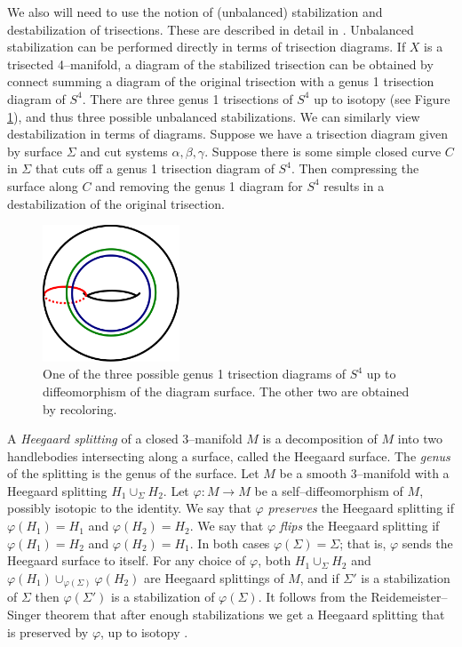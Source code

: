 \documentclass[12pt]{amsart}
\theoremstyle{definition}
\theoremstyle{remark}
\begin{document}
We also will need to use the notion of (unbalanced) stabilization and destabilization of trisections.
These are described in detail in \cite{MeierSchirmerZupan1}.
Unbalanced stabilization can be performed directly in terms of trisection diagrams.
If $X$ is a trisected 4--manifold, a diagram of the stabilized trisection can be obtained by connect summing a diagram of the original trisection with a genus 1 trisection diagram of $S^4$.
There are three genus 1 trisections of $S^4$ up to isotopy (see Figure \ref{s3g1}), and thus three possible unbalanced stabilizations.
We can similarly view destabilization in terms of diagrams.
Suppose we have a trisection diagram given by surface $\Sigma$ and cut systems $\alpha,\beta,\gamma$.
Suppose there is some simple closed curve $C$ in $\Sigma$ that cuts off a genus 1 trisection diagram of $S^4$.
Then compressing the surface along $C$ and removing the genus 1 diagram for $S^4$ results in a destabilization of the original trisection.


\begin{figure}[h]
\centering
\includegraphics[height=1.6in]{S4trisection_genus1.png}
\caption{One of the three possible genus 1 trisection diagrams of $S^4$ up to diffeomorphism of the diagram surface.
The other two are obtained by recoloring.}
\label{s3g1}
\end{figure}

A \emph{Heegaard splitting} of a closed 3--manifold $M$ is a decomposition of $M$ into two handlebodies intersecting along a surface, called the Heegaard surface.
The \emph{genus} of the splitting is the genus of the surface.
Let $M$ be a smooth 3--manifold with a Heegaard splitting $H_1 \cup_\Sigma H_2$.
Let $\varphi \colon M \to M$ be a self--diffeomorphism of $M$, possibly isotopic to the identity.
We say that $\varphi$ \emph{preserves} the Heegaard splitting if $\varphi(H_1) = H_1$ and $\varphi(H_2)=H_2$.
We say that $\varphi$ \emph{flips} the Heegaard splitting if $\varphi(H_1) = H_2$ and $\varphi(H_2)=H_1$.
In both cases $\varphi(\Sigma) = \Sigma$; that is, $\varphi$ sends the Heegaard surface to itself.
For any choice of $\varphi$, both $H_1 \cup_\Sigma H_2$ and $\varphi(H_1) \cup_{\varphi(\Sigma)} \varphi(H_2)$ are Heegaard splittings of $M$, and if $\Sigma'$ is a stabilization of $\Sigma$ then $\varphi(\Sigma')$ is a stabilization of $\varphi(\Sigma)$.
It follows from the Reidemeister--Singer theorem that after enough stabilizations we get a Heegaard splitting that is preserved by $\varphi$, up to isotopy \cite{Reidemeister1}\cite{Singer1}.
\end{document}
